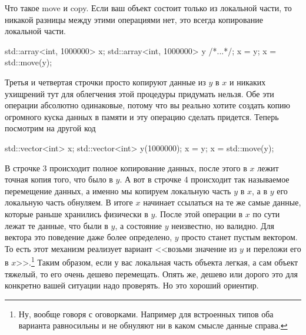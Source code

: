 \documentclass{article}
\begin{document}
Что такое move и copy. Если ваш объект состоит только из локальной части, то никакой разницы между этими операциями нет, это всегда копирование локальной части.
\begin{cppcode}
std::array<int, 1000000> x;
std::array<int, 1000000> y {/*...*/};
x = y;
x = std::move(y);
\end{cppcode}
Третья и четвертая строчки просто копируют данные из $y$ в $x$ и никаких ухищрений тут для облегчения этой процедуры придумать нельзя. Обе эти операции абсолютно одинаковые, потому что вы реально хотите создать копию огромного куска данных в памяти и эту операцию сделать придется. Теперь посмотрим на другой код
\begin{cppcode}
std::vector<int> x;
std::vector<int> y(1000000);
x = y;
x = std::move(y);
\end{cppcode}
В строчке 3 происходит полное копирование данных, после этого в $x$ лежит точная копия того, что было в $y$. А вот в строчке 4 происходит так называемое перемещение данных, а именно мы копируем локальную часть $y$ в $x$, а в $y$ его локальную часть обнуляем. В итоге $x$ начинает ссылаться на те же самые данные, которые раньше хранились физически в $y$. После этой операции в $x$ по сути лежат те данные, что были в $y$, а состояние $y$ неизвестно, но валидно. Для вектора это поведение даже более определено, $y$ просто станет пустым вектором. То есть этот механизм реализует вариант <<возьми значение из $y$ и переложи его в $x$>>.\footnote{Ну, вообще говоря с оговорками. Например для встроенных типов оба варианта равносильны и не обнуляют ни в каком смысле данные справа.} Таким образом, если у вас локальная часть объекта легкая, а сам объект тяжелый, то его очень дешево перемещать. Опять же, дешево или дорого это для конкретно вашей ситуации надо проверять. Но это хороший ориентир.
\end{document}

